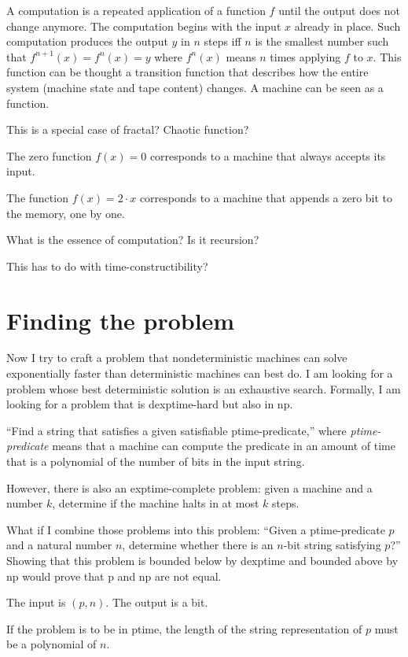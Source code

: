A computation is a repeated application of a function $f$
until the output does not change anymore.
The computation begins with the input $x$ already in place.
Such computation produces the output $y$
in $n$ steps iff $n$ is the smallest number such that $f^{n+1}(x) = f^n(x) = y$
where $f^n(x)$ means $n$ times applying $f$ to $x$.
This function can be thought a transition function that describes
how the entire system (machine state and tape content) changes.
A machine can be seen as a function.

This is a special case of fractal? Chaotic function?

The zero function $f(x) = 0$ corresponds to a machine
that always accepts its input.

The function $f(x) = 2 \cdot x$ corresponds to a machine
that appends a zero bit to the memory, one by one.

What is the essence of computation?
Is it recursion?

This has to do with time-constructibility?

\section{Finding the problem}

Now I try to craft a problem that nondeterministic machines
can solve exponentially faster than deterministic machines can best do.
I am looking for a problem whose best deterministic solution
is an exhaustive search.
Formally, I am looking for a problem that is dexptime-hard but also in np.

``Find a string that satisfies a given satisfiable ptime-predicate,''
where \emph{ptime-predicate} means that
a machine can compute the predicate in an amount of time
that is a polynomial of the number of bits in the input string.

However, there is also an exptime-complete problem:
given a machine and a number $k$, determine if the machine
halts in at most $k$ steps.

What if I combine those problems into this problem:
``Given a ptime-predicate $p$ and a natural number $n$,
determine whether there is an $n$-bit string satisfying $p$?''
Showing that this problem is bounded below by dexptime
and bounded above by np would prove that p and np are not equal.

The input is $(p,n)$.
The output is a bit.

If the problem is to be in ptime,
the length of the string representation of $p$
must be a polynomial of $n$.

